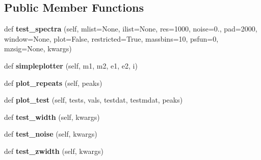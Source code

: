 \subsection*{Public Member Functions}
\begin{DoxyCompactItemize}
\item 
\hypertarget{class_uni_dec_1_1unidec__tests_1_1_uni_dec_test_a08242f9b9df1f340dd55cc21a3badb54}{}def {\bfseries test\+\_\+spectra} (self, mlist=None, ilist=None, res=1000, noise=0., pad=2000, window=None, plot=False, restricted=True, massbins=10, psfun=0, mzsig=None, kwargs)\label{class_uni_dec_1_1unidec__tests_1_1_uni_dec_test_a08242f9b9df1f340dd55cc21a3badb54}

\item 
\hypertarget{class_uni_dec_1_1unidec__tests_1_1_uni_dec_test_a231773da46ef137706e10cfab5aa192f}{}def {\bfseries simpleplotter} (self, m1, m2, e1, e2, i)\label{class_uni_dec_1_1unidec__tests_1_1_uni_dec_test_a231773da46ef137706e10cfab5aa192f}

\item 
\hypertarget{class_uni_dec_1_1unidec__tests_1_1_uni_dec_test_acc8105e8a101cf0c3fccbef09e178a45}{}def {\bfseries plot\+\_\+repeats} (self, peaks)\label{class_uni_dec_1_1unidec__tests_1_1_uni_dec_test_acc8105e8a101cf0c3fccbef09e178a45}

\item 
\hypertarget{class_uni_dec_1_1unidec__tests_1_1_uni_dec_test_aa2795e1e953879c19ed7dbcdbd52a928}{}def {\bfseries plot\+\_\+test} (self, tests, vals, testdat, testmdat, peaks)\label{class_uni_dec_1_1unidec__tests_1_1_uni_dec_test_aa2795e1e953879c19ed7dbcdbd52a928}

\item 
\hypertarget{class_uni_dec_1_1unidec__tests_1_1_uni_dec_test_a3a7bc444baa2261883a289040543ad23}{}def {\bfseries test\+\_\+width} (self, kwargs)\label{class_uni_dec_1_1unidec__tests_1_1_uni_dec_test_a3a7bc444baa2261883a289040543ad23}

\item 
\hypertarget{class_uni_dec_1_1unidec__tests_1_1_uni_dec_test_a6a017fbc9b8072f208e7c46bacdf8d66}{}def {\bfseries test\+\_\+noise} (self, kwargs)\label{class_uni_dec_1_1unidec__tests_1_1_uni_dec_test_a6a017fbc9b8072f208e7c46bacdf8d66}

\item 
\hypertarget{class_uni_dec_1_1unidec__tests_1_1_uni_dec_test_ae022c73aa884c79e4c17f48ac67fa3d1}{}def {\bfseries test\+\_\+zwidth} (self, kwargs)\label{class_uni_dec_1_1unidec__tests_1_1_uni_dec_test_ae022c73aa884c79e4c17f48ac67fa3d1}


\end{DoxyCompactItemize}
